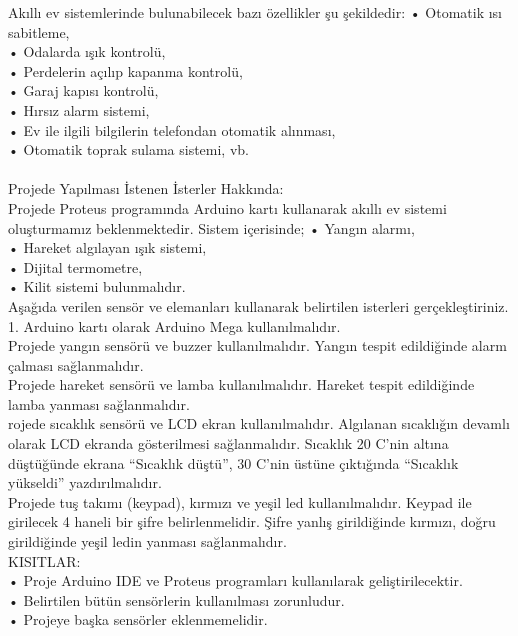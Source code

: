 \documentclass[conference]{IEEEtran}
\begin{document}
Akıllı ev sistemlerinde bulunabilecek bazı özellikler şu şekildedir:
• Otomatik ısı sabitleme,\\
• Odalarda ışık kontrolü,\\
• Perdelerin açılıp kapanma kontrolü,\\
• Garaj kapısı kontrolü,\\
• Hırsız alarm sistemi,\\
• Ev ile ilgili bilgilerin telefondan otomatik alınması,\\
• Otomatik toprak sulama sistemi, vb.\\

\\
Projede Yapılması İstenen İsterler Hakkında:\\
Projede Proteus programında Arduino kartı kullanarak akıllı ev sistemi oluşturmamız 
beklenmektedir. Sistem içerisinde;
• Yangın alarmı, \\
• Hareket algılayan ışık sistemi,\\ 
• Dijital termometre,\\
• Kilit sistemi bulunmalıdır. \\ 
Aşağıda verilen sensör ve elemanları kullanarak belirtilen isterleri gerçekleştiriniz.\\
1. Arduino kartı olarak Arduino Mega kullanılmalıdır.\\

Projede yangın sensörü ve buzzer kullanılmalıdır. Yangın tespit edildiğinde alarm çalması sağlanmalıdır.\\
Projede hareket sensörü ve lamba kullanılmalıdır. Hareket tespit edildiğinde lamba yanması 
sağlanmalıdır.\\
rojede sıcaklık sensörü ve LCD ekran kullanılmalıdır. Algılanan sıcaklığın devamlı olarak 
LCD ekranda gösterilmesi sağlanmalıdır. Sıcaklık 20 C’nin altına düştüğünde ekrana 
“Sıcaklık düştü”, 30 C’nin üstüne çıktığında “Sıcaklık yükseldi” yazdırılmalıdır.\\
Projede tuş takımı (keypad), kırmızı ve yeşil led kullanılmalıdır. Keypad ile girilecek 4 
haneli bir şifre belirlenmelidir. Şifre yanlış girildiğinde kırmızı, doğru girildiğinde yeşil 
ledin yanması sağlanmalıdır.\\
KISITLAR: \\
• Proje Arduino IDE ve Proteus programları kullanılarak geliştirilecektir. \\
• Belirtilen bütün sensörlerin kullanılması zorunludur.\\
• Projeye başka sensörler eklenmemelidir.\\
\end{document}
